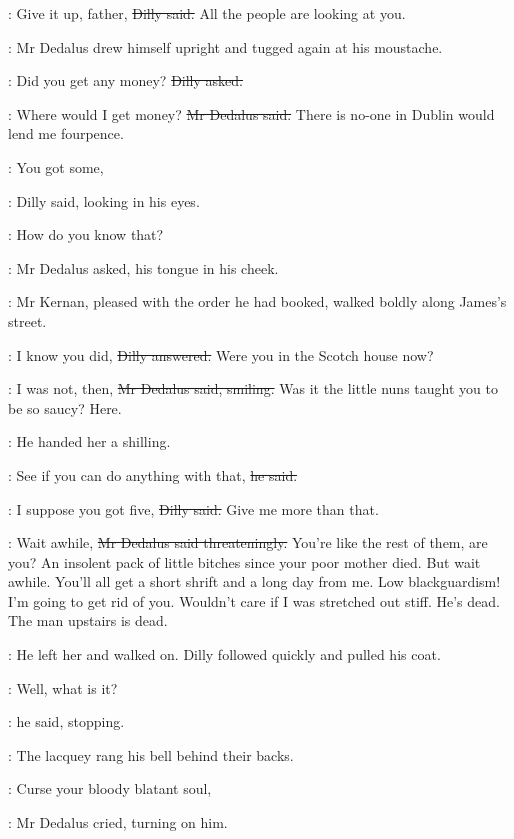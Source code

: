 \dilly:
Give it up, father,
\sout{Dilly said.}
All the people are looking at you.

:
Mr Dedalus drew himself upright
and tugged again at his moustache.

\dilly:
Did you get any money?
\sout{Dilly asked.}

\simon:
Where would I get money?
\sout{Mr Dedalus said.}
There is no-one in Dublin would lend me fourpence.%

\dilly:
You got some,

:
Dilly said,
looking in his eyes.

\simon:
How do you know that?

:
Mr Dedalus asked,
his tongue in his cheek.

\begin{mdframed}
    :
    Mr Kernan,
    pleased with the order he had booked,
    walked boldly along James's street.
\end{mdframed}

\dilly:
I know you did,
\sout{Dilly answered.}
Were you in the Scotch house now?

\simon:
I was not, then,
\sout{Mr Dedalus said, smiling.}
Was it the little nuns taught you to be so saucy?
Here.

:
He handed her a shilling.

\simon:
See if you can do anything with that,
\sout{he said.}

\dilly:
I suppose you got five,
\sout{Dilly said.}
Give me more than that.

\simon:
Wait awhile,
\sout{Mr Dedalus said threateningly.}
You're like the rest of them, are you?
An insolent pack of little bitches since your poor mother died.
But wait awhile.
You'll all get a short shrift and a long day from me.
Low blackguardism!
I'm going to get rid of you.
Wouldn't care if I was stretched out stiff.
He's dead.
The man upstairs is dead.

:
He left her and walked on.
Dilly followed quickly and pulled his coat.

\simon:
Well, what is it?

:
he said, stopping.

:
The lacquey rang his bell behind their backs.


\simon:
Curse your bloody blatant soul,

:
Mr Dedalus cried,
turning on him.


